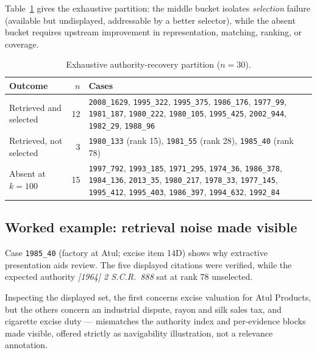 \documentclass[conference]{IEEEtran}
\begin{document}
Table~\ref{tab:buckets} gives the exhaustive partition: the middle bucket
isolates \emph{selection} failure (available but undisplayed, addressable by a
better selector), while the absent bucket requires upstream
improvement in representation, matching, ranking, or coverage.

\begin{table}[t]
\caption{Exhaustive authority-recovery partition ($n=30$).}
\label{tab:buckets}
\centering
\footnotesize
\begin{tabular}{p{2.35cm}rp{4.4cm}}
\toprule
\textbf{Outcome} & \textbf{$n$} & \textbf{Cases} \\
\midrule
Retrieved and selected & 12 &
\texttt{2008\_1629}, \texttt{1995\_322}, \texttt{1995\_375},
\texttt{1986\_176}, \texttt{1977\_99}, \texttt{1981\_187},
\texttt{1980\_222}, \texttt{1980\_105}, \texttt{1995\_425},
\texttt{2002\_944}, \texttt{1982\_29}, \texttt{1988\_96} \\
\addlinespace
Retrieved, not selected & 3 &
\texttt{1980\_133} (rank 15), \texttt{1981\_55} (rank 28),
\texttt{1985\_40} (rank 78) \\
Absent at $k{=}100$ & 15 &
\texttt{1997\_792}, \texttt{1993\_185}, \texttt{1971\_295},
\texttt{1974\_36}, \texttt{1986\_378}, \texttt{1984\_136},
\texttt{2013\_35}, \texttt{1980\_217}, \texttt{1978\_33},
\texttt{1977\_145}, \texttt{1995\_412}, \texttt{1995\_403},
\texttt{1986\_397}, \texttt{1994\_632}, \texttt{1992\_84} \\
\bottomrule
\end{tabular}
\end{table}

\subsection{Worked example: retrieval noise made visible}

Case \texttt{1985\_40} (factory at Atul; excise item 14D) shows why extractive
presentation aids review. The five displayed citations were verified, while the
expected authority \emph{[1964] 2 S.C.R.\ 888} sat at rank 78 unselected.

Inspecting the displayed set, the first concerns excise valuation for Atul
Products, but the others concern an industrial dispute, rayon and silk sales
tax, and cigarette excise duty --- mismatches the authority index and
per-evidence blocks made visible, offered strictly as navigability
illustration, not a relevance annotation.

\end{document}
